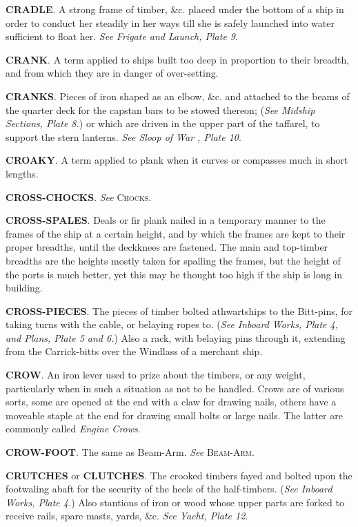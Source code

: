 \textbf{CRADLE}. A strong frame of timber, \&c. placed under the bottom of a ship in order to conduct her steadily in her ways till she is safely launched into water sufficient to float her. \textit{See Frigate and Launch, Plate 9}. 

\textbf{CRANK}. A term applied to ships built too deep in proportion to their breadth, and from which they are in danger of over-setting. 

\textbf{CRANKS}. Pieces of iron shaped as an elbow, \&c. and attached to the beams of the quarter deck for the capstan bars to be stowed thereon; (\textit{See Midship Sections, Plate 8.}) or which are driven in the upper part of the taffarel, to support the stern lanterns. \textit{See Sloop of War , Plate 10}. 

\textbf{CROAKY}. A term applied to plank when it curves or compasses much in short lengths. 

\textbf{CROSS-CHOCKS}. \textit{See} \textsc{Chocks}.

\textbf{CROSS-SPALES}. Deals or fir plank nailed in a temporary manner to the frames of the ship at a certain height, and by which the frames are kept to their proper breadths, until the deckknees are fastened. The main and top-timber breadths are the heights mostly taken for spalling the frames, but the height of the ports is much better, yet this may be thought too high if the ship is long in building. 
 
\textbf{CROSS-PIECES}. The pieces of timber bolted athwartships to the Bitt-pins, for taking turns with the cable, or belaying ropes to. (\textit{See Inboard Works, Plate 4, and Plans, Plate 5 and 6.}) Also a rack, with belaying pins through it, extending from the Carrick-bitts over the Windlass of a merchant ship. 
 
\textbf{CROW}. An iron lever used to prize about the timbers, or any weight, particularly when in such a situation as not to be handled. Crows are of various sorts, some are opened at the end with a claw for drawing nails, others have a moveable staple at the end for drawing small bolts or large nails. The latter are commonly called \textit{Engine Crows}. 
 
\textbf{CROW-FOOT}. The same as Beam-Arm. \textit{See} \textsc{Beam-Arm}. 

\textbf{CRUTCHES} or \textbf{CLUTCHES}. The crooked timbers fayed and bolted upon the footwaling abaft for the security of the heels of the half-timbers. (\textit{See Inboard Works, Plate 4.}) Also stantions of iron or wood whose upper parts are forked to receive rails, spare masts, yards, \&c. \textit{See Yacht, Plate 12}.

